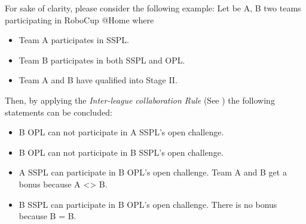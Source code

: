 For sake of clarity, please consider the following example: Let be A, B two teams participating in RoboCup @Home where
\begin{itemize}
	\item Team A participates in SSPL.
	\item Team B participates in both SSPL and OPL.
	\item Team A and B have qualified into Stage II.
\end{itemize}
Then, by applying the \textit{Inter-league collaboration Rule} (See ) the following statements can be concluded:
\begin{itemize}
	\item B OPL can not participate in A SSPL's open challenge.
	\item B OPL can not participate in B SSPL's open challenge.
	\item A SSPL can participate in B OPL's open challenge. Team A and B get a bonus because A <> B.
	\item B SSPL can participate in B OPL's open challenge. There is no bonus because B = B.
\end{itemize}




